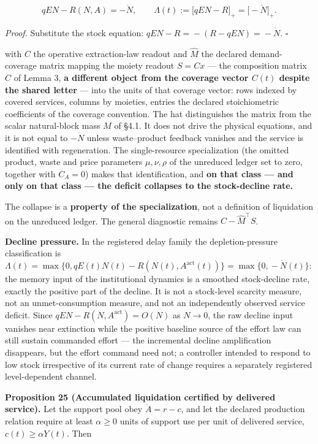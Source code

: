 \documentclass[11pt]{article}
\begin{document}
$$qEN - R(N,A) = -\dot N, \qquad \Lambda(t) := \bigl[ qEN - R \bigr]_+ = \bigl[ -\dot N \bigr]_+.$$



\emph{Proof.} Substitute the stock equation: \(qEN - R =\allowbreak{} -(R - qEN) =\allowbreak{} -\dot N\). \(\square\)

with \(C\) the operative extraction-law readout and \(\hat M\) the declared demand-coverage matrix mapping the moiety readout \(S=Cx\) --- the composition matrix \(C\) of Lemma 3, \textbf{a different object from the coverage vector \(C(t)\) despite the shared letter} --- into the units of that coverage vector: rows indexed by covered services, columns by moieties, entries the declared stoichiometric coefficients of the coverage convention. The hat distinguishes the matrix from the scalar natural-block mass \(M\) of \S4.1. It does not drive the physical equations, and it is not equal to \(-\dot N\) unless waste--product feedback vanishes and the service is identified with regeneration. The single-resource specialization (the omitted product, waste and price parameters \(\mu,\nu,\rho\) of the unreduced ledger set to zero, together with \(C_A=0\)) makes that identification, and \textbf{on that class --- and only on that class --- the deficit collapses to the stock-decline rate.}

The collapse is a \textbf{property of the specialization}, not a definition of liquidation on the unreduced ledger. The general diagnostic remains \(C-\hat M^{\top}S\).

\textbf{Decline pressure.} In the registered delay family the depletion-pressure classification is \(\Lambda(t) =\allowbreak{} \max\{0,\allowbreak{} qE(t)N(t) - R(N(t),\allowbreak{} A^{\mathrm{act}}(t))\} =\allowbreak{} \max\{0,\allowbreak{} -\dot N(t)\}\): the memory input of the institutional dynamics is a smoothed stock-decline rate, exactly the positive part of the decline. It is not a stock-level scarcity measure, not an unmet-consumption measure, and not an independently observed service deficit. Since \(qEN - R(N,\allowbreak{} A^{\mathrm{act}}) =\allowbreak{} O(N)\) as \(N \to 0\), the raw decline input vanishes near extinction while the positive baseline source of the effort law can still sustain commanded effort --- the incremental decline amplification disappears, but the effort command need not; a controller intended to respond to low stock irrespective of its current rate of change requires a separately registered level-dependent channel.

\textbf{Proposition 25 (Accumulated liquidation certified by delivered service).} Let the support pool obey \(\dot A=r-c\), and let the declared production relation require at least \(\alpha\ge0\) units of support use per unit of delivered service, \(c(t)\ge\alpha Y(t)\). Then 
\end{document}
